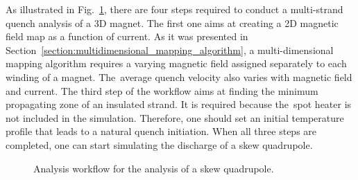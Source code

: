 
As illustrated in Fig.~\ref{fig:block_diagram_skew_quad_analysis_workflow}, there are four steps required to conduct a multi-strand quench analysis of a 3D magnet. The first one aims at creating a 2D magnetic field map as a function of current. As it was presented in Section~\ref{section:multidimensional_mapping_algorithm}, a multi-dimensional mapping algorithm requires a varying magnetic field assigned separately to each winding of a magnet. The~average quench velocity also varies with magnetic field and current. The third step of the workflow aims at finding the minimum propagating zone of an insulated strand. It is required because the~spot heater is not included in the simulation. Therefore, one should set an initial temperature profile that leads to a natural quench initiation. When all three steps are completed, one can start simulating the discharge of a skew quadrupole.

\begin{figure}[H]
    \centering
    \caption{Analysis workflow for the analysis of a skew quadrupole.}
    \label{fig:block_diagram_skew_quad_analysis_workflow}
\end{figure}
